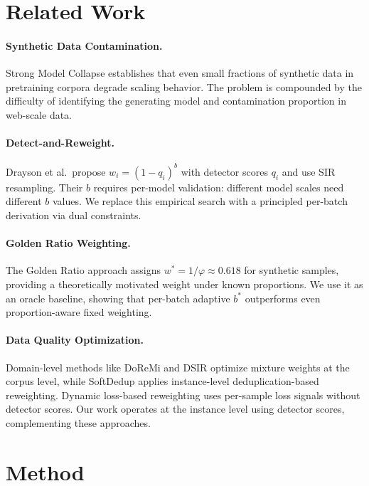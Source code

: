 \documentclass[11pt,a4paper]{article}
\newcommand{\bstar}{b^{*}}
\begin{document}
\section{Related Work}
\label{sec:related}

\paragraph{Synthetic Data Contamination.}
Strong Model Collapse establishes that even small fractions of synthetic data in pretraining corpora degrade scaling behavior.
The problem is compounded by the difficulty of identifying the generating model and contamination proportion in web-scale data.

\paragraph{Detect-and-Reweight.}
Drayson et al.\ propose $w_i = (1 - q_i)^b$ with detector scores $q_i$ and use SIR resampling.
Their $b$ requires per-model validation: different model scales need different $b$ values.
We replace this empirical search with a principled per-batch derivation via dual constraints.

\paragraph{Golden Ratio Weighting.}
The Golden Ratio approach assigns $w^* = 1/\varphi \approx 0.618$ for synthetic samples, providing a theoretically motivated weight under known proportions.
We use it as an oracle baseline, showing that per-batch adaptive $\bstar$ outperforms even proportion-aware fixed weighting.

\paragraph{Data Quality Optimization.}
Domain-level methods like DoReMi and DSIR optimize mixture weights at the corpus level, while SoftDedup applies instance-level deduplication-based reweighting.
Dynamic loss-based reweighting uses per-sample loss signals without detector scores.
Our work operates at the instance level using detector scores, complementing these approaches.


\section{Method}
\label{sec:method}
\end{document}

